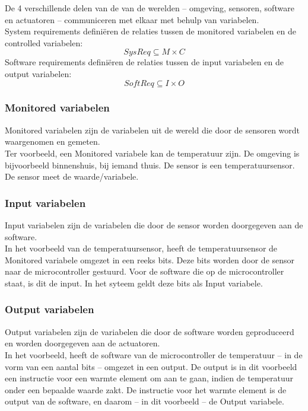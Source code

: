 \documentclass{article}
\begin{document}
\noindent
De 4 verschillende delen van de van de werelden -- omgeving, sensoren, software en actuatoren -- communiceren met elkaar met behulp van variabelen. \\
		System requirements definiëren de relaties tussen de monitored variabelen en de controlled variabelen:
		\[ SysReq \subseteq M \times C\]
		Software requirements definiëren de relaties tussen de input variabelen en de output variabelen:
		\[ SoftReq \subseteq I \times O \]
		
			\subsubsection{Monitored variabelen}
			
			Monitored variabelen zijn de variabelen uit de wereld die door de sensoren wordt waargenomen en gemeten. \\
			Ter voorbeeld, een Monitored variabele kan de temperatuur zijn. De omgeving is bijvoorbeeld binnenshuis, bij iemand thuis. De sensor is een temperatuursensor. De sensor meet de waarde/variabele. \par
			
			\subsubsection{Input variabelen}
			
			Input variabelen zijn de variabelen die door de sensor worden doorgegeven aan de software. \\
			In het voorbeeld van de temperatuursensor, heeft de temperatuursensor de Monitored variabele omgezet in een reeks bits. Deze bits worden door de sensor naar de microcontroller gestuurd. Voor de software die op de microcontroller staat, is dit de input. In het syteem geldt deze bits als Input variabele. \par
			
			\subsubsection{Output variabelen}
			
			Output variabelen zijn de variabelen die door de software worden geproduceerd en worden doorgegeven aan de actuatoren. \\
			In het voorbeeld, heeft de software van de microcontroller de temperatuur -- in de vorm van een aantal bits -- omgezet in een output. De output is in dit voorbeeld een instructie voor een warmte element om aan te gaan, indien de temperatuur onder een bepaalde waarde zakt. De instructie voor het warmte element is de output van de software, en daarom -- in dit voorbeeld -- de Output variabele. \par
\end{document}
